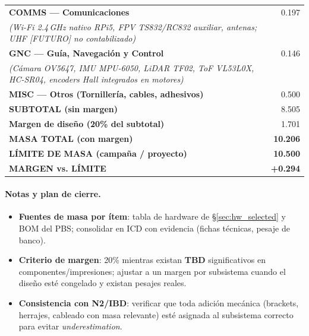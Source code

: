 \begin{table}[H]
\begin{tabular}{p{7.5cm} r}
\textbf{COMMS — Comunicaciones} & 0.197 \\
\textit{(Wi-Fi 2.4\,GHz nativo RPi5, FPV TS832/RC832 auxiliar, antenas; UHF [FUTURO] no contabilizado)} & \\[1ex]

\textbf{GNC — Guía, Navegación y Control} & 0.146 \\
\textit{(Cámara OV5647, IMU MPU-6050, LiDAR TF02, ToF VL53L0X, HC-SR04, encoders Hall integrados en motores)} & \\[1ex]

\textbf{MISC — Otros (Tornillería, cables, adhesivos)} & 0.500 \\
\hline
\textbf{SUBTOTAL (sin margen)} & 8.505 \\
\textbf{Margen de diseño (20\% del subtotal)} & 1.701 \\
\hline
\textbf{MASA TOTAL (con margen)} & \textbf{10.206} \\
\hline
\textbf{LÍMITE DE MASA (campaña / proyecto)} & \textbf{10.500} \\
\textbf{MARGEN vs. LÍMITE} & \textbf{+0.294} \\
\hline
\end{tabular}
\end{table}

\paragraph{Notas y plan de cierre.}
\begin{itemize}
  \item \textbf{Fuentes de masa por ítem}: tabla de hardware de §\ref{sec:hw_selected} y BOM del PBS; consolidar en ICD con evidencia (fichas técnicas, pesaje de banco). \cite{nasa_cm}
  \item \textbf{Criterio de margen}: 20\% mientras existan \textbf{TBD} significativos en componentes/impresiones; ajustar a un margen por subsistema cuando el diseño esté congelado y existan pesajes reales. \cite{nasa_cm, segoldmine_ppi}
  \item \textbf{Consistencia con N2/IBD}: verificar que toda adición mecánica (brackets, herrajes, cableado con masa relevante) esté asignada al subsistema correcto para evitar \emph{underestimation}. \cite{nasa_cm}
\end{itemize}

